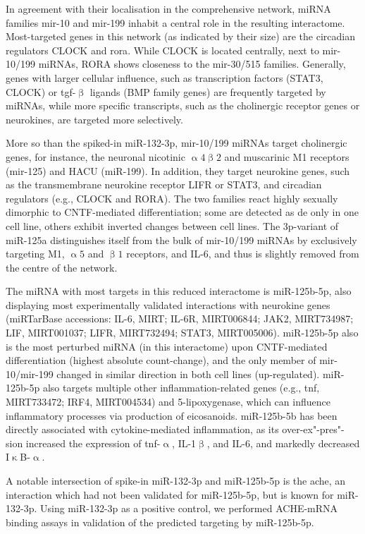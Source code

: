In agreement with their localisation in the comprehensive network, miRNA families mir-10 and mir-199 inhabit a central role in the resulting interactome. Most-targeted genes in this network (as indicated by their size) are the circadian regulators CLOCK and \acs{rora}. While CLOCK is located centrally, next to mir-10/199 miRNAs, RORA shows closeness to the mir-30/515 families. Generally, genes with larger cellular influence, such as transcription factors (STAT3, CLOCK) or \ac{tgf}-$\upbeta$ ligands (BMP family genes) are frequently targeted by miRNAs, while more specific transcripts, such as the cholinergic receptor genes or neurokines, are targeted more selectively.

More so than the spiked-in miR-132-3p, mir-10/199 miRNAs target cholinergic genes, for instance, the neuronal nicotinic $\upalpha4\upbeta2$ and muscarinic M1 receptors (mir-125) and HACU (miR-199). In addition, they target neurokine genes, such as the transmembrane neurokine receptor LIFR or STAT3, and circadian regulators (e.g., CLOCK and RORA). The two families react highly sexually dimorphic to CNTF-mediated differentiation; some are detected as \ac{de} only in one cell line, others exhibit inverted changes between cell lines. The 3p-variant of miR-125a distinguishes itself from the bulk of mir-10/199 miRNAs by exclusively targeting M1, $\upalpha5$ and $\upbeta1$ receptors, and IL-6, and thus is slightly removed from the centre of the network.

The miRNA with most targets in this reduced interactome is miR-125b-5p, also displaying most experimentally validated interactions with neurokine genes (miRTarBase accessions: IL-6, MIRT; IL-6R, MIRT006844; JAK2, MIRT734987; LIF, MIRT001037; LIFR, MIRT732494; \linebreak STAT3, MIRT005006). miR-125b-5p also is the most perturbed miRNA (in this interactome) upon CNTF-mediated differentiation (highest absolute count-change), and the only member of mir-10/mir-199 changed in similar direction in both cell lines (up-regulated). miR-125b-5p also targets multiple other inflammation-related genes (e.g., \ac{tnf}, MIRT733472; IRF4, MIRT004534) and 5-lipoxygenase, which can influence inflammatory processes via production of eicosanoids.\cite{Busch2015} miR-125b-5b has been directly associated with cytokine-mediated inflammation, as its over-ex"-pres"-sion increased the expression of \ac{tnf}-$\upalpha$, IL-1$\upbeta$, and IL-6, and markedly decreased I$\upkappa$B-$\upalpha$.\cite{Zhang2017}

A notable intersection of spike-in miR-132-3p and miR-125b-5p is the \ac{ache}, an interaction which had not been validated for miR-125b-5p, but is known for miR-132-3p.\cite{Shaked2009, Shaltiel2013} Using miR-132-3p as a positive control, we performed ACHE-mRNA binding assays in validation of the predicted targeting by miR-125b-5p.

